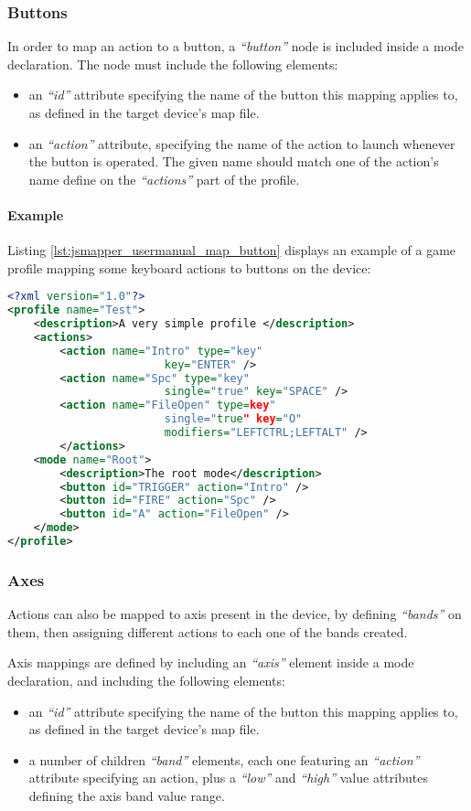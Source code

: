\subsubsection{Buttons}\label{chap:usermanual_mapping_buttons}
In order to map an action to a button, a \emph{``button''} node is included inside a mode declaration. The node must include the following elements:
\begin{itemize}
	\item an \emph{``id''} attribute specifying the name of the button this mapping applies to, as defined in the target device's map file.
	\item an \emph{``action''} attribute, specifying the name of the action to launch whenever the button is operated. The given name should match one of the action's name define on the \emph{``actions''} part of the profile.
\end{itemize}

\paragraph{Example}
Listing \ref{lst:jsmapper_usermanual_map_button} displays an example of a game profile mapping some keyboard actions to buttons on the device:
\begin{lstlisting}[language=XML,caption={Mapping buttons},label={lst:jsmapper_usermanual_map_button}]
<?xml version="1.0"?>
<profile name="Test">
	<description>A very simple profile </description>
	<actions>
		<action name="Intro" type="key" 
						key="ENTER" />
		<action name="Spc" type="key" 
						single="true" key="SPACE" />
		<action name="FileOpen" type=key" 
						single="true" key="O" 
						modifiers="LEFTCTRL;LEFTALT" />
		</actions>  
	<mode name="Root">
		<description>The root mode</description>
		<button id="TRIGGER" action="Intro" />
		<button id="FIRE" action="Spc" />
		<button id="A" action="FileOpen" />
	</mode>
</profile>
\end{lstlisting}

\subsubsection{Axes}\label{chap:usermanual_mapping_axes}
Actions can also be mapped to axis present in the device, by defining \emph{``bands''} on them, then assigning different actions to each one of the bands created.

Axis mappings are defined by including an \emph{``axis''} element inside a mode declaration, and including the following elements:
\begin{itemize}
	\item an \emph{``id''} attribute specifying the name of the button this mapping applies to, as defined in the target device's map file.
	\item a number of children \emph{``band''} elements, each one featuring an \emph{``action''} attribute specifying an action, plus a \emph{``low''} and \emph{``high''} value attributes defining the axis band value range.
\end{itemize}

